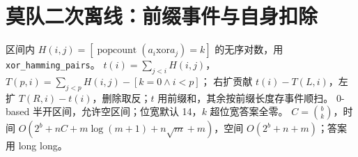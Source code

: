\section{莫队二次离线：前缀事件与自身扣除}\label{knowledge-mo-secondary}
区间内 $H(i,j)=[\operatorname{popcount}(a_i\mathbin{\mathrm{xor}}a_j)=k]$ 的无序对数，用 \texttt{xor\_hamming\_pairs}。
$t(i)=\sum_{j<i}H(i,j)$，$T(p,i)=\sum_{j<p}H(i,j)-[k=0\land i<p]$；
右扩贡献 $t(i)-T(L,i)$，左扩 $T(R,i)-t(i)$，删除取反；$t$ 用前缀和，其余按前缀长度存事件顺扫。
0-based 半开区间，允许空区间；位宽默认 14，$k$ 超位宽答案全零。
$C=\binom bk$，时间 $O(2^b+nC+m\log(m+1)+n\sqrt m+m)$，空间 $O(2^b+n+m)$；答案用 long long。
